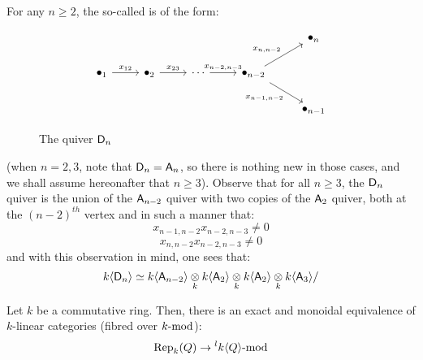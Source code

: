             \begin{example}
                For any $n \geq 2$, the so-called  is of the form:
                    \begin{figure}[H]
                        \centering
                            $$
                                \begin{tikzcd}
                                	&&&& {\bullet_n} \\
                                	{\bullet_1} & {\bullet_2} & \cdots & {\bullet_{n - 2}} \\
                                	&&&& {\bullet_{n - 1}}
                                	\arrow["{x_{12}}", from=2-1, to=2-2]
                                	\arrow["{x_{23}}", from=2-2, to=2-3]
                                	\arrow["{x_{n - 2, n - 3}}", from=2-3, to=2-4]
                                	\arrow["{x_{n, n - 2}}", from=2-4, to=1-5]
                                	\arrow["{x_{n - 1, n - 2}}"', from=2-4, to=3-5]
                                \end{tikzcd}
                            $$
                        \caption{The quiver $\sfD_n$}
                        \label{fig: D_n_quiver}
                    \end{figure}
                (when $n = 2, 3$, note that $\sfD_n = \sfA_n$, so there is nothing new in those cases, and we shall assume hereonafter that $n \geq 3$). Observe that for all $n \geq 3$, the $\sfD_n$ quiver is the union of the $\sfA_{n - 2}$ quiver with two copies of the $\sfA_2$ quiver, both at the $(n - 2)^{th}$ vertex and in such a manner that:
                    $$x_{n - 1, n - 2} x_{n - 2, n - 3} \not = 0$$
                    $$x_{n, n - 2} x_{n - 2, n - 3} \not = 0$$
                and with this observation in mind, one sees that:
                    $$k\<\sfD_n\> \cong k\<\sfA_{n - 2}\> \tensor_k k\<\sfA_2\> \tensor_k k\<\sfA_2\> \tensor_k k\<\sfA_3\>/$$
            \end{example}
            \begin{example}
                
            \end{example}
            \begin{proposition} \label{prop: quiver_representations_are_modules_over_quiver_algebras}
                Let $k$ be a commutative ring. Then, there is an exact and monoidal equivalence of $k$-linear categories (fibred over $k\mod$):
                    $$\Rep_k(Q) \to {}^lk\<Q\>\mod$$
            \end{proposition}
